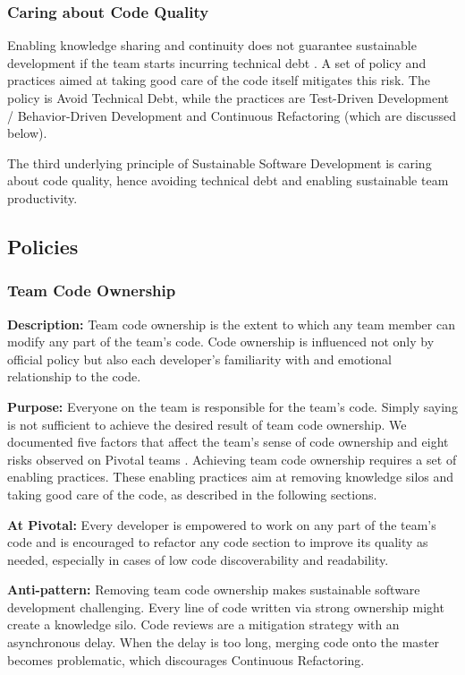 \subsubsection{Caring about Code Quality}

Enabling knowledge sharing and continuity does not guarantee sustainable development if the team starts incurring technical debt \cite{McConnellTechnicalDebt}. A set of policy and practices aimed at taking good care of the code itself mitigates this risk. The policy is Avoid Technical Debt, while the practices are Test-Driven Development / Behavior-Driven Development and Continuous Refactoring (which are discussed below).

The third underlying principle of Sustainable Software Development is caring about code quality, hence avoiding technical debt and enabling sustainable team productivity.
\subsection{Policies}

\subsubsection{Team Code Ownership}

\textbf{Description:} Team code ownership is the extent to which any team member can modify any part of the team's code. Code ownership is influenced not only by official policy but also each developer's familiarity with and emotional relationship to the code.

\textbf{Purpose:} Everyone on the team is responsible for the team's code. Simply saying  is not sufficient to achieve the desired result of team code ownership. We documented five factors that affect the team's sense of code ownership and eight risks observed on Pivotal teams \cite{SedanoTeamCodeOwnership}. Achieving team code ownership requires a set of enabling practices. These enabling practices aim at removing knowledge silos and taking good care of the code, as described in the following sections.

\textbf{At Pivotal:} Every developer is empowered to work on any part of the team's code and is encouraged to refactor any code section to improve its quality as needed, especially in cases of low code discoverability and readability.

\textbf{Anti-pattern:} Removing team code ownership makes sustainable software development challenging. Every line of code written via strong ownership might create a knowledge silo. Code reviews are a mitigation strategy with an asynchronous delay. When the delay is too long, merging code onto the master becomes problematic, which discourages Continuous Refactoring. 

